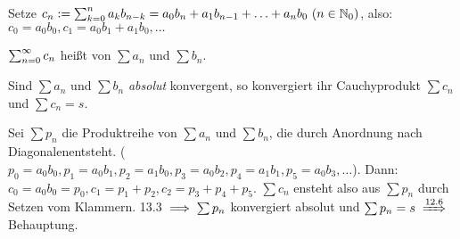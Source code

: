 \documentclass[a4paper,twoside,DIV15,BCOR12mm]{scrbook}
\begin{document}
\begin{definition}[Cauchyprodukt]
Setze $c_n := \sum_{k=0}^{n}{a_k b_{n-k}} = a_0b_n+a_1b_{n-1}+\ldots+a_nb_0\ (n\in\mathbb{N}_0)$, also: $c_0 = a_0b_0, c_1 = a_0b_1+a_1b_0, \ldots$

$\sum_{n=0}^{\infty}{c_n}$ heißt  von $\sum{a_n}$ und $\sum{b_n}$.
\end{definition}


%
%
%

\begin{satz}
Sind $\sum{a_n}$ und $\sum{b_n}$ \emph{absolut} konvergent, so konvergiert ihr Cauchyprodukt $\sum{c_n}$ und $\sum{c_n} = s$.
\end{satz}

\begin{beweis}
Sei $\sum{p_n}$ die Produktreihe von $\sum{a_n}$ und $\sum{b_n}$, die durch \glqq Anordnung nach Diagonalen\grqq entsteht. ($p_0 = a_0b_0, p_1=a_0b_1, p_2 = a_1b_0, p_3 = a_0b_2, p_4 = a_1b_1, p_5=a_0b_3, \ldots$). Dann: $c_0  =a_0b_0 = p_0, c_1=p_1+p_2, c_2 = p_3+p_4+p_5$. $\sum{c_n}$ ensteht also aus $\sum{p_n}$ durch Setzen vom Klammern. 13.3 $\implies \sum{p_n}$ konvergiert absolut und $\sum{p_n} = s \folgtnach{12.6}$ Behauptung.
\end{beweis}
\end{document}
